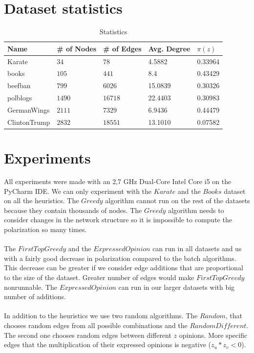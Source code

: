 \section{Dataset statistics}
\label{sec:stats}

\begin{table}[H]
 \centering
 \caption{Statistics}
 \label{tab:statistics}
 \begin{tabular}{| l || l | l | l | l |}
 \hline
  Name & \# of Nodes & \# of Edges & Avg. Degree & $\pi(z)$\\
  \hline
  \hline
  Karate & $34$ & $78$ & 4.5882 &  0.33964\\
  \hline
    books & $105$ & $441$ & 8.4 &  0.43429\\
  \hline
    beefban & $799$ & $6026$ & 15.0839 &  0.30326\\
  \hline
  polblogs & $1490$ & $16718$ & 22.4403 &  0.30983\\
  \hline
  GermanWings & $2111$ & $7329$ & 6.9436 &  0.44479\\
  \hline
  ClintonTrump & $2832$ & $18551$ & 13.1010 &  0.07582\\
  \hline
 \end{tabular}
 \end{table}
 
\vspace{20pt}
\clearpage

\section{Experiments}
\label{sec:experim}

All experiments were made with an 2,7 GHz Dual-Core Intel Core i5 on the PyCharm IDE. We can only experiment with the $Karate$ and the $Books$ dataset on all the heuristics. The $Greedy$ algorithm cannot run on the rest of the datasets because they contain thousands of nodes. The $Greedy$ algorithm needs to consider changes in the network structure so it is impossible to compute the polarization so many times.
\\
\\ 
The $FirstTopGreedy$ and the $Expressed Opinion$ can run in all datasets and us with a fairly good decrease in polarization compared to the batch algorithms. This decrease can be greater if we consider edge additions that are proportional to the size of the dataset. Greater number of edges would make $FirstTopGreedy$ nonrunnable. The $Expressed Opinion$ can run in our larger datasets with big number of additions.
\\
\\
In addition to the heuristics we use two random algorithms. The $Random$, that chooses random edges from all possible combinations and the $RandomDifferent$. The second one chooses random edges between different $z$ opinions. More specific edges that the multiplication of their expressed opinions is negative ($z_u*z_v < 0$). 
\clearpage

